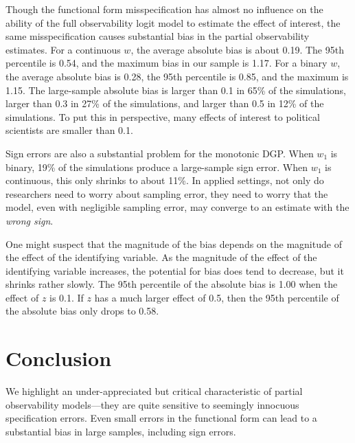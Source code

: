 \documentclass[10pt]{article}
\begin{document}
Though the functional form misspecification has almost no influence on the ability of the full observability logit model to estimate the effect of interest, the same misspecification causes substantial bias in the partial observability estimates. 
For a continuous $w$, the average absolute bias is about 0.19. The 95th percentile is 0.54, and the maximum bias in our sample is 1.17. 
For a binary $w$, the average absolute bias is 0.28, the 95th percentile is 0.85, and the maximum is 1.15. 
The large-sample absolute bias is larger than 0.1 in 65\% of the simulations, larger than 0.3 in 27\% of the simulations, and larger than 0.5 in 12\% of the simulations. 
To put this in perspective, many effects of interest to political scientists are smaller than 0.1. 

Sign errors are also a substantial problem for the monotonic DGP. 
When $w_1$ is binary, 19\% of the simulations produce a large-sample sign error. 
When $w_1$ is continuous, this only shrinks to about 11\%. 
In applied settings, not only do researchers need to worry about sampling error, they need to worry that the model, even with negligible sampling error, may converge to an estimate with the \textit{wrong sign}.

One might suspect that the magnitude of the bias depends on the magnitude of the effect of the identifying variable. As the magnitude of the effect of the identifying variable increases, the potential for bias does tend to decrease, but it shrinks rather slowly. The 95th percentile of the absolute bias is 1.00 when the effect of $z$ is 0.1. If $z$ has a much larger effect of 0.5, then the 95th percentile of the absolute bias only drops to 0.58.

\section*{Conclusion}

We highlight an under-appreciated but critical characteristic of partial observability models---they are quite sensitive to seemingly innocuous specification errors. 
Even small errors in the functional form can lead to a substantial bias in large samples, including sign errors.
\end{document}
